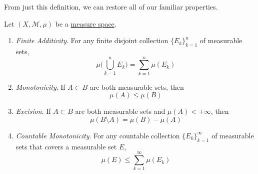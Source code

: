   From just this definition, we can restore all of our familiar properties. 

  \begin{theorem}
    \label{thm:axiomatic-properties-of-measure}
    Let $(X, \mathcal{M}, \mu)$ be a \hyperref[def:measure-space]{measure space}. 
    \begin{enumerate}
      \item \textit{Finite Additivity}. For any finite disjoint collection $\{E_k\}_{k=1}^n$ of measurable sets, 
        \begin{equation}
          \mu \bigg( \bigcup_{k=1}^n E_k \bigg) = \sum_{k=1}^n \mu(E_k)
        \end{equation}
      \item \textit{Monotonicity}. If $A \subset B$ are both measurable sets, then 
        \begin{equation}
          \mu(A) \leq \mu(B)
        \end{equation}
      \item \textit{Excision}. If $A \subset B$ are both measurable sets and $\mu(A) < +\infty$, then 
        \begin{equation}
          \mu(B \setminus A) = \mu(B) - \mu(A)
        \end{equation}
      \item \textit{Countable Monotonicity}. For any countable collection $\{E_k\}_{k=1}^\infty$ of measurable sets that covers a measurable set $E$, 
        \begin{equation}
          \mu(E) \leq \sum_{k=1}^\infty \mu(E_k)
        \end{equation}
    \end{enumerate}
  \end{theorem}
